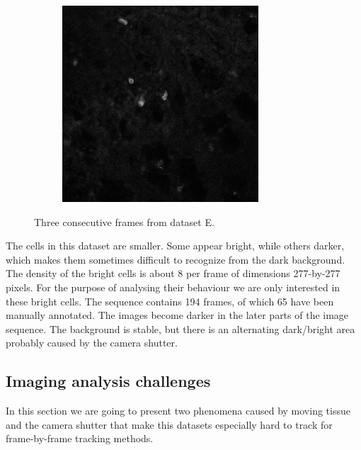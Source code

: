 \begin{figure}[h]
\begin{subfigure}{.32\textwidth}
		\end{subfigure}
		\hfill
		\begin{subfigure}{.32\textwidth}
		\includegraphics[width=\textwidth]{images/seriesm170_13cropped018}
		\end{subfigure}
		\caption{Three consecutive frames from dataset E.}
		\label{fig:data_datasetE}
	\end{figure}
    
    The cells in this dataset are smaller. Some appear bright, while others darker, which makes them sometimes difficult to recognize from the dark background. The density of the bright cells is about 8 per frame of dimensions 277-by-277 pixels. For the purpose of analysing their behaviour we are only interested in these bright cells. The sequence contains 194 frames, of which 65 have been manually annotated. The images become darker in the later parts of the image sequence. The background is stable, but there is an alternating dark/bright area probably caused by the camera shutter.
    	
	\subsection{Imaging analysis challenges \statusfirstdraft}
	\label{sec:data_challenges}
	In this section we are going to present two phenomena caused by moving tissue and the camera shutter that make this datasets especially hard to track for frame-by-frame tracking methods.
	
